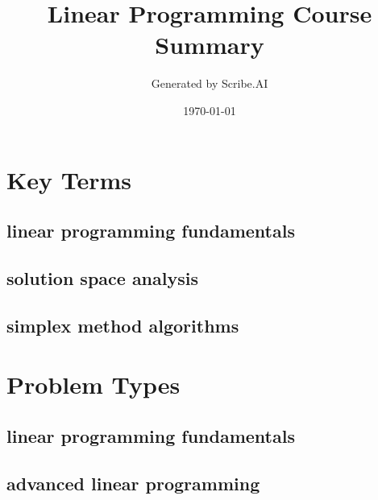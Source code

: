 \documentclass{article}%
\title{Linear Programming Course Summary}%
\author{Generated by Scribe.AI}%
\date{\today}%
\begin{document}
%
\normalsize%
\maketitle%
\section{Key Terms}%
\label{sec:KeyTerms}%
\begin{itemize}[leftmargin=*]%
\subsection{linear programming fundamentals}%
\label{subsec:linearprogrammingfundamentals}%
\begin{itemize}[leftmargin=*]%
%
\end{itemize}

%
\subsection{solution space analysis}%
\label{subsec:solutionspaceanalysis}%
\begin{itemize}[leftmargin=*]%
%
\end{itemize}

%
\subsection{simplex method algorithms}%
\label{subsec:simplexmethodalgorithms}%
\begin{itemize}[leftmargin=*]%
%
\end{itemize}

%
\end{itemize}%
\newpage

%
\section{Problem Types}%
\label{sec:ProblemTypes}%
\begin{itemize}[leftmargin=*]%
\subsection{linear programming fundamentals}%
\label{subsec:linearprogrammingfundamentals}%
\begin{itemize}[leftmargin=*]%
%
\end{itemize}

%
\subsection{advanced linear programming}%
\label{subsec:advancedlinearprogramming}%
\begin{itemize}[leftmargin=*]%
%
\end{itemize}

%
\end{itemize}%
\newpage
\end{document}
